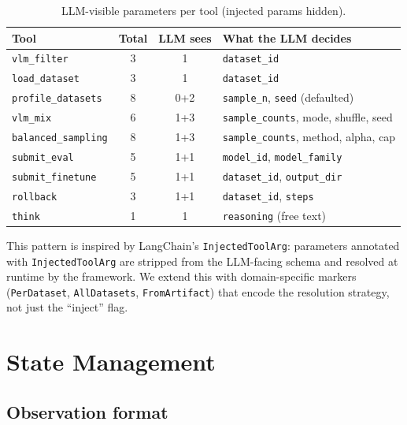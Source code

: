 \begin{table}[H]
\centering
\caption{LLM-visible parameters per tool (injected params hidden).}
\label{tab:effective-action-space}
\begin{tabular}{lccp{5.5cm}}
\toprule
\textbf{Tool} & \textbf{Total} & \textbf{LLM sees} & \textbf{What the LLM decides} \\
\midrule
\texttt{vlm\_filter}       & 3 & 1   & \texttt{dataset\_id} \\
\texttt{load\_dataset}     & 3 & 1   & \texttt{dataset\_id} \\
\texttt{profile\_datasets} & 8 & 0+2 & \texttt{sample\_n}, \texttt{seed} (defaulted) \\
\texttt{vlm\_mix}          & 6 & 1+3 & \texttt{sample\_counts}, mode, shuffle, seed \\
\texttt{balanced\_sampling}& 8 & 1+3 & \texttt{sample\_counts}, method, alpha, cap \\
\texttt{submit\_eval}      & 5 & 1+1 & \texttt{model\_id}, \texttt{model\_family} \\
\texttt{submit\_finetune}  & 5 & 1+1 & \texttt{dataset\_id}, \texttt{output\_dir} \\
\texttt{rollback}          & 3 & 1+1 & \texttt{dataset\_id}, \texttt{steps} \\
\texttt{think}             & 1 & 1   & \texttt{reasoning} (free text) \\
\bottomrule
\end{tabular}
\end{table}

\noindent This pattern is inspired by LangChain's \texttt{InjectedToolArg}: parameters annotated with \texttt{InjectedToolArg} are stripped from the LLM-facing schema and resolved at runtime by the framework.
We extend this with domain-specific markers (\texttt{PerDataset}, \texttt{AllDatasets}, \texttt{FromArtifact}) that encode the resolution strategy, not just the ``inject'' flag.


\newpage
\section{State Management}
\label{sec:state}

\subsection{Observation format}

